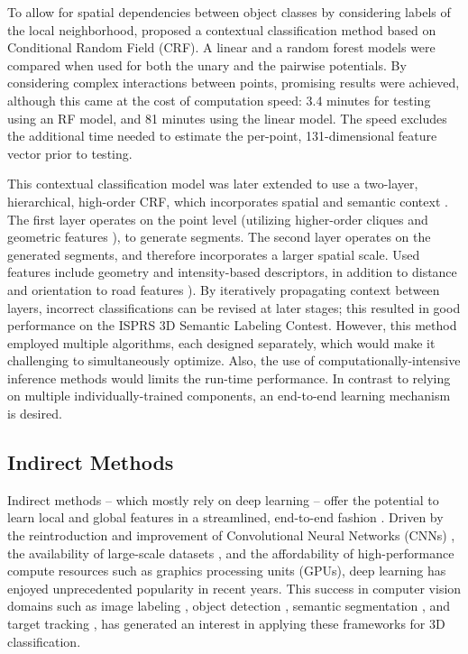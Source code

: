 \documentclass[final,3p,times,twocolumn,authoryear]{elsarticle}
\begin{document}
To allow for spatial dependencies between object classes by considering labels of the local neighborhood, \citet{NIEMEYER2014152} proposed a contextual classification method based on Conditional Random Field (CRF). A linear and a random forest models were compared when used for both the unary and the pairwise potentials.
By considering complex interactions between points, promising results were achieved, although this came at the cost of computation speed: 3.4 minutes for testing using an RF model, and 81 minutes using the linear model. 
The speed excludes the additional time needed to estimate the per-point, 131-dimensional feature vector prior to testing.
 

This contextual classification model was later extended to use a two-layer, hierarchical, high-order CRF, which incorporates spatial and semantic context \citep{NIEMEYER2016}. 
The first layer operates on the point level (utilizing higher-order cliques and geometric features \citep{weinnman2014}), to generate segments. 
The second layer operates on the generated segments, and therefore incorporates a larger spatial scale. 
Used features include geometry and intensity-based descriptors, in addition to distance and orientation to road features \citep{Golovinskiy}). 
By iteratively propagating context between layers, incorrect classifications can be revised at later stages; this resulted in good performance on the ISPRS 3D Semantic Labeling Contest. 
However, this method employed multiple algorithms, each designed separately, which would make it challenging to simultaneously optimize. Also, the use of computationally-intensive inference methods would limits the run-time performance.
In contrast to relying on multiple individually-trained components, an end-to-end learning mechanism is desired. 

\subsection{Indirect Methods}
\label{sec:indirect_methods}
Indirect methods -- which mostly rely on deep learning -- offer the potential to learn local and global features in a streamlined, end-to-end fashion \citep{deepvis}. 
Driven by the reintroduction and improvement of Convolutional Neural Networks (CNNs) \citep{LeCun1989b,resnet}, the availability of large-scale datasets \citep{imagenet}, and the affordability of high-performance compute resources such as graphics processing units (GPUs), deep learning has enjoyed unprecedented popularity in recent years. 
This success in computer vision domains such as image labeling \citep{Alex_NIPS2012}, object detection \citep{RCNN2014}, semantic segmentation \citep{Segnet_PAMI,FCN}, and target tracking \citep{DLT,SPT}, has generated an interest in applying these frameworks for 3D classification. 
\end{document}
